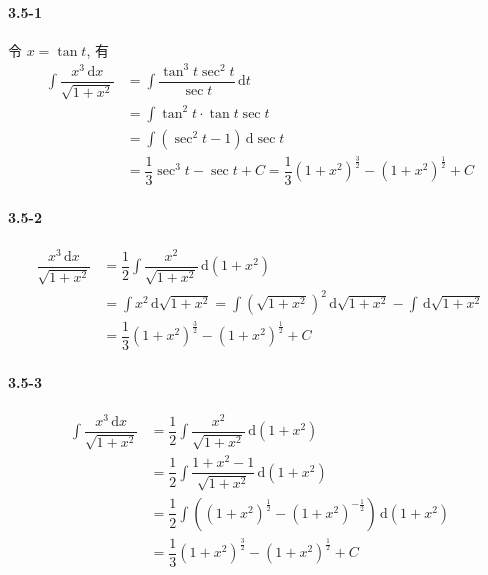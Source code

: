 \paragraph*{3.5-1}

令 $x=\tan t$, 有
\[
\begin{aligned}
	\int \dfrac{x^3\,\mathrm dx}{\sqrt{1+x^2}}&=\int\dfrac{\tan^3 t\sec^2 t}{\sec t}\,\mathrm dt\\
	&=\int \tan^2 t\cdot\tan t\sec t\\
	&=\int (\sec^2 t-1)\,\mathrm d\sec t\\
	&=\dfrac{1}{3}\sec^3 t-\sec t+C=\dfrac{1}{3}\left(1+x^2\right)^{\frac{3}{2}}-\left(1+x^2\right)^{\frac{1}{2}}+C 
\end{aligned}
\]
\paragraph*{3.5-2}
\[
	\begin{aligned}
\dfrac{x^3\,\mathrm dx}{\sqrt{1+x^2}}&=\dfrac{1}{2}\int\dfrac{x^2}{\sqrt{1+x^2}}\,\mathrm d\left(1+x^2\right)\\
&=\int x^2\,\mathrm d\sqrt{1+x^2}=\int\left(\sqrt{1+x^2}\right)^2\,\mathrm d\sqrt{1+x^2}-\int\,\mathrm d\sqrt{1+x^2}\\
&=\dfrac{1}{3}\left(1+x^2\right)^{\frac{3}{2}}-\left(1+x^2\right)^{\frac{1}{2}}+C 
	\end{aligned}
\]
\paragraph*{3.5-3}
\[
	\begin{aligned}
\int\dfrac{x^3\,\mathrm dx}{\sqrt{1+x^2}}&=\dfrac{1}{2}\int\dfrac{x^2}{\sqrt{1+x^2}}\,\mathrm d\left(1+x^2\right)\\
&=\dfrac{1}{2}\int\dfrac{1+x^2-1}{\sqrt{1+x^2}}\,\mathrm d\left(1+x^2\right)\\
&=\dfrac{1}{2}\int\left(\left(1+x^2\right)^{\frac{1}{2}}-\left(1+x^2\right)^{-\frac{1}{2}}\right)\,\mathrm d\left(1+x^2\right)\\
&=\dfrac{1}{3}\left(1+x^2\right)^{\frac{3}{2}}-\left(1+x^2\right)^{\frac{1}{2}}+C 
	\end{aligned}
\]
